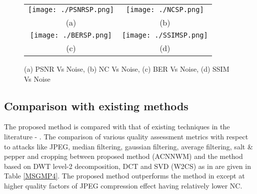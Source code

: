 \begin{figure*}
\begin{tabular}{cc}
\texttt{[image: ./PSNRSP.png]}&\texttt{[image: ./NCSP.png]}\\
(a)  & (b) \\
\texttt{[image: ./BERSP.png]}&\texttt{[image: ./SSIMSP.png]}\\
(c)   & (d)
\end{tabular}
\caption{(a) PSNR Vs Noise, (b) NC Vs Noise,  (c) BER Vs Noise,  (d) SSIM Vs Noise }
\label{CBSaltPepper}

\end{figure*}

\subsection{Comparison with existing methods}

The proposed method is compared with that of existing techniques in the literature  \cite{P4}- \cite{P20}. The comparison of various quality assessment metrics with respect to attacks like JPEG,  median filtering, gaussian filtering, average filtering, salt \& pepper and cropping between proposed method (ACNNWM) and the method based on DWT level-2 decomposition, DCT and SVD (W2CS) as in \cite{P4} are given in Table \ref{MSGMP4}. The proposed method outperforms the method in \cite{P4} except at higher quality factors of JPEG compression effect having relatively lower NC.\\

